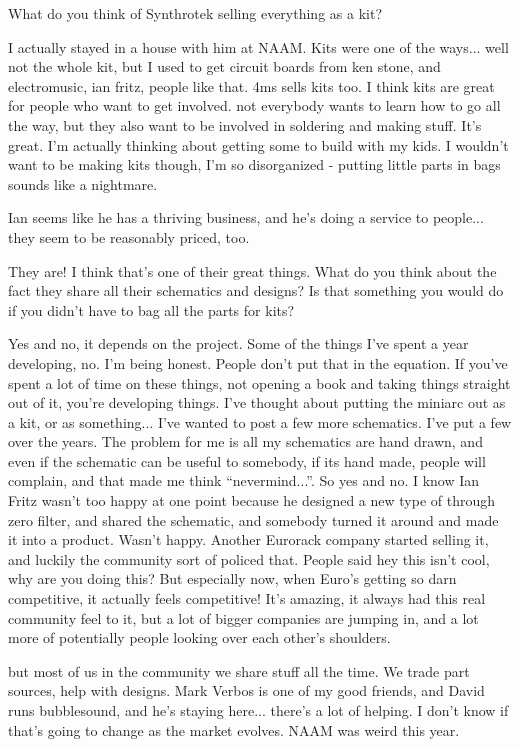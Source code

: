 What do you think of Synthrotek selling everything as a kit? 

I actually stayed in a house with him at NAAM. Kits were one of the ways... well not the whole kit, but I used to get circuit boards from ken stone, and electromusic, ian fritz, people like that. 4ms sells kits too. I think kits are great for people who want to get involved. not everybody wants to learn how to go all the way, but they also want to be involved in soldering and making stuff. It's great. I'm actually thinking about getting some to build with my kids. I wouldn't want to be making kits though, I'm so disorganized - putting little parts in bags sounds like a nightmare. 

Ian seems like he has a thriving business, and he's doing a service to people... they seem to be reasonably priced, too. 

They are! I think that's one of their great things. What do you think about the fact they share all their schematics and designs? Is that something you would do if you didn't have to bag all the parts for kits? 

Yes and no, it depends on the project. Some of the things I've spent a year developing, no. I'm being honest. People don't put that in the equation. If you've spent a lot of time on these things, not opening a book and taking things straight out of it, you're developing things. I've thought about putting the miniarc out as a kit, or as something... I've wanted to post a few more schematics. I've put a few over the years. The problem for me is all my schematics are hand drawn, and even if the schematic can be useful to somebody, if its hand made, people will complain, and that made me think ``nevermind...''. So yes and no. I know Ian Fritz wasn't too happy at one point because he designed a new type of through zero filter, and shared the schematic, and somebody turned it around and made it into a product. Wasn't happy. Another Eurorack company started selling it, and luckily the community sort of policed that. People said hey this isn't cool, why are you doing this? But especially now, when Euro's getting so darn competitive, it actually feels competitive! It's amazing, it always had this real community feel to it, but a lot of bigger companies are jumping in, and a lot more of potentially people looking over each other's shoulders. 

but most of us in the community we share stuff all the time. We trade part sources, help with designs. Mark Verbos is one of my good friends, and David runs bubblesound, and he's staying here... there's a lot of helping. I don't know if that's going to change as the market evolves. NAAM was weird this year. 

